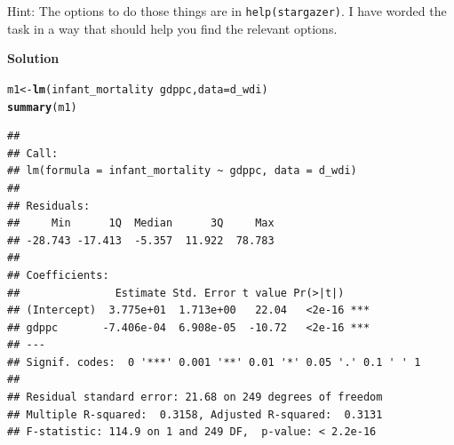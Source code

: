 \documentclass{article}\usepackage[]{graphicx}\usepackage[]{color}
\makeatletter
\newcommand{\hlopt}[1]{\textcolor[rgb]{0,0,0}{#1}}%
\newcommand{\hlstd}[1]{\textcolor[rgb]{0.345,0.345,0.345}{#1}}%
\newcommand{\hlkwb}[1]{\textcolor[rgb]{0.69,0.353,0.396}{#1}}%
\newcommand{\hlkwc}[1]{\textcolor[rgb]{0.333,0.667,0.333}{#1}}%
\newcommand{\hlkwd}[1]{\textcolor[rgb]{0.737,0.353,0.396}{\textbf{#1}}}%
\newenvironment{kframe}{%
 \def\at@end@of@kframe{}%
 \ifinner\ifhmode%
  \def\at@end@of@kframe{\end{minipage}}%
  \begin{minipage}{\columnwidth}%
 \fi\fi%
 \def\FrameCommand##1{\hskip\@totalleftmargin \hskip-\fboxsep
 \colorbox{shadecolor}{##1}\hskip-\fboxsep
     \hskip-\linewidth \hskip-\@totalleftmargin \hskip\columnwidth}%
 \MakeFramed {\advance\hsize-\width
   \@totalleftmargin\z@ \linewidth\hsize
   \@setminipage}}%
 {\par\unskip\endMakeFramed%
 \at@end@of@kframe}
\newenvironment{knitrout}{}{} %
\makeatother
\begin{document}
Hint: The options to do those things are in \verb`help(stargazer)`. I have worded the task in a way that should help you find the relevant options.

\textbf{Solution}

\begin{knitrout}
\color{fgcolor}\begin{kframe}
\begin{alltt}
\hlstd{m1} \hlkwb{<-} \hlkwd{lm}\hlstd{(infant_mortality} \hlopt{~} \hlstd{gdppc,} \hlkwc{data} \hlstd{= d_wdi)}
\hlkwd{summary}\hlstd{(m1)}
\end{alltt}
\begin{verbatim}
## 
## Call:
## lm(formula = infant_mortality ~ gdppc, data = d_wdi)
## 
## Residuals:
##     Min      1Q  Median      3Q     Max 
## -28.743 -17.413  -5.357  11.922  78.783 
## 
## Coefficients:
##               Estimate Std. Error t value Pr(>|t|)    
## (Intercept)  3.775e+01  1.713e+00   22.04   <2e-16 ***
## gdppc       -7.406e-04  6.908e-05  -10.72   <2e-16 ***
## ---
## Signif. codes:  0 '***' 0.001 '**' 0.01 '*' 0.05 '.' 0.1 ' ' 1
## 
## Residual standard error: 21.68 on 249 degrees of freedom
## Multiple R-squared:  0.3158,	Adjusted R-squared:  0.3131 
## F-statistic: 114.9 on 1 and 249 DF,  p-value: < 2.2e-16
\end{verbatim}
\end{kframe}
\end{knitrout}
\end{document}
